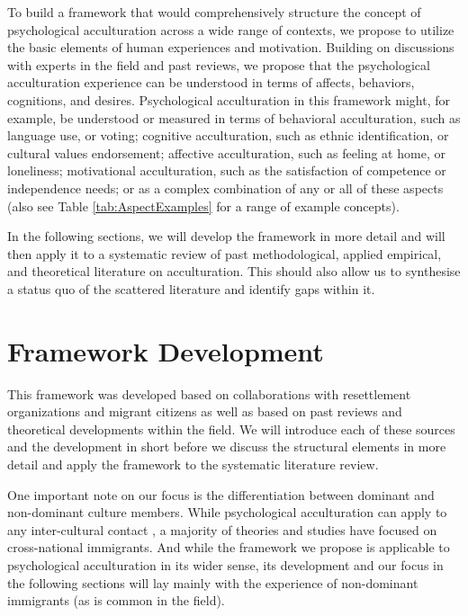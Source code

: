 \documentclass[man, 12pt, a4paper]{apa7}
\begin{document}
To build a framework that would comprehensively structure the concept of psychological acculturation across a wide range of contexts, we propose to utilize the basic elements of human experiences and motivation.
Building on discussions with experts in the field and past reviews, we propose that the psychological acculturation experience can be understood in terms of affects, behaviors, cognitions, and desires. Psychological acculturation in this framework might, for example, be understood or measured in terms of behavioral acculturation, such as language use, or voting; cognitive acculturation, such as ethnic identification, or cultural values endorsement; affective acculturation, such as feeling at home, or loneliness; motivational acculturation, such as the satisfaction of competence or independence needs; or as a complex combination of any or all of these aspects (also see Table \ref{tab:AspectExamples} for a range of example concepts). 

In the following sections, we will develop the framework in more detail and will then apply it to a systematic review of past methodological, applied empirical, and theoretical literature on acculturation. This should also allow us to synthesise a status quo of the scattered literature and identify gaps within it.



\section{Framework Development} 

This framework was developed based on collaborations with resettlement organizations and migrant citizens as well as based on past reviews and theoretical developments within the field. We will introduce each of these sources and the development in short before we discuss the structural elements in more detail and apply the framework to the systematic literature review.

One important note on our focus is the differentiation between dominant and non-dominant culture members. While psychological acculturation can apply to any inter-cultural contact \citep[including, for example, the contact between indigenous people and colonial settlers, e.g.,][]{Berry1974}, a majority of theories and studies have focused on cross-national immigrants. And while the framework we propose is applicable to psychological acculturation in its wider sense, its development and our focus in the following sections will lay mainly with the experience of non-dominant immigrants (as is common in the field).
\end{document}
